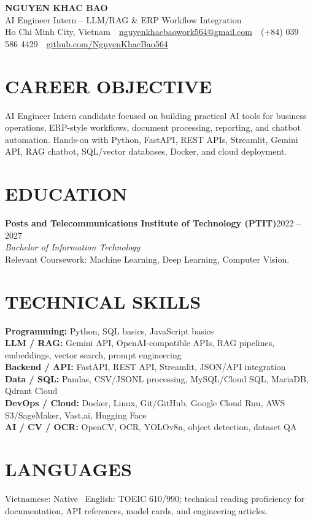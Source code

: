 \documentclass[10pt,a4paper]{article}
\newcommand{\entryhead}[2]{%
    \noindent\textbf{#1}\hfill #2\\[-2pt]
}
\newcommand{\entrysub}[1]{%
    \noindent\textit{#1}\\[-1pt]
}
\begin{document}
\fontsize{9}{9.9}\selectfont

\begin{center}
    {\Large\textbf{NGUYEN KHAC BAO}}\\[-1pt]
    AI Engineer Intern -- LLM/RAG \& ERP Workflow Integration\\[2pt]
    Ho Chi Minh City, Vietnam
    \,\textbar\,
    \href{mailto:nguyenkhacbaowork564@gmail.com}{nguyenkhacbaowork564@gmail.com}
    \,\textbar\,
    (+84) 039 586 4429
    \,\textbar\,
    \href{https://github.com/NguyenKhacBao564}{github.com/NguyenKhacBao564}
\end{center}

\section{CAREER OBJECTIVE}
AI Engineer Intern candidate focused on building practical AI tools for business operations, ERP-style workflows, document processing, reporting, and chatbot automation. Hands-on with Python, FastAPI, REST APIs, Streamlit, Gemini API, RAG chatbot, SQL/vector databases, Docker, and cloud deployment.

\section{EDUCATION}
\entryhead{Posts and Telecommunications Institute of Technology (PTIT)}{2022 -- 2027}
\entrysub{Bachelor of Information Technology}
Relevant Coursework: Machine Learning, Deep Learning, Computer Vision.

\section{TECHNICAL SKILLS}
\textbf{Programming:} Python, SQL basics, JavaScript basics\\
\textbf{LLM / RAG:} Gemini API, OpenAI-compatible APIs, RAG pipelines, embeddings, vector search, prompt engineering\\
\textbf{Backend / API:} FastAPI, REST API, Streamlit, JSON/API integration\\
\textbf{Data / SQL:} Pandas, CSV/JSONL processing, MySQL/Cloud SQL, MariaDB, Qdrant Cloud\\
\textbf{DevOps / Cloud:} Docker, Linux, Git/GitHub, Google Cloud Run, AWS S3/SageMaker, Vast.ai, Hugging Face\\
\textbf{AI / CV / OCR:} OpenCV, OCR, YOLOv8n, object detection, dataset QA

\section{LANGUAGES}
Vietnamese: Native \textbar\ English: TOEIC 610/990; technical reading proficiency for documentation, API references, model cards, and engineering articles.
\end{document}
